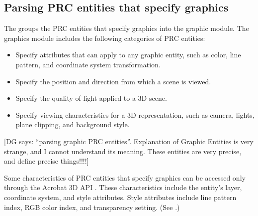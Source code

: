 \documentclass[letterpaper,12pt,english,openany,oneside]{sphinxmanual}
\begin{document}
\begin{sphinxVerbatim}[commandchars=\\\{\}]
 
\end{sphinxVerbatim}


\subsection{Parsing PRC entities that specify graphics}
\label{\detokenize{Plugins_A3D_API:parsing-prc-entities-that-specify-graphics}}
The  groups the PRC entities that specify graphics into the graphic module. The graphics module includes the following categories of PRC entities:
\begin{itemize}
\item {} 
 Specify attributes that can apply to any graphic entity, such as color, line pattern, and coordinate system transformation.

\item {} 
 Specify the position and direction from which a scene is viewed.

\item {} 
 Specify the quality of light applied to a 3D scene.

\item {} 
 Specify viewing characteristics for a 3D representation, such as camera, lights, plane clipping, and background style.

\end{itemize}

{[}DG says: “parsing graphic PRC entities”. Explanation of Graphic Entities is very strange, and I cannot understand its meaning. These entities are very precise, and define precise things!!!!{]}

Some characteristics of PRC entities that specify graphics can be accessed only through the Acrobat 3D API . These characteristics include the entity’s layer, coordinate system, and style attributes. Style attributes include line pattern index, RGB color index, and transparency setting. (See .)
\end{document}
